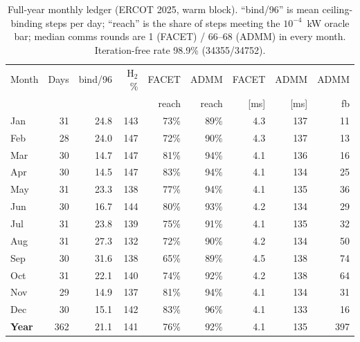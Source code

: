 \begin{table}[H]\centering\small
\begin{tabular}{lrrrrrrrr}
\toprule
Month & Days & bind/96 & H$_2$\% & FACET & ADMM & FACET & ADMM & ADMM\\
 & & & & reach & reach & [ms] & [ms] & fb\\
\midrule
Jan & 31 & 24.8 & 143 & 73\% & 89\% & 4.3 & 137 & 11\\
Feb & 28 & 24.0 & 147 & 72\% & 90\% & 4.3 & 137 & 13\\
Mar & 30 & 14.7 & 147 & 81\% & 94\% & 4.1 & 136 & 16\\
Apr & 30 & 14.5 & 147 & 83\% & 94\% & 4.1 & 134 & 25\\
May & 31 & 23.3 & 138 & 77\% & 94\% & 4.1 & 135 & 36\\
Jun & 30 & 16.7 & 144 & 80\% & 93\% & 4.2 & 134 & 29\\
Jul & 31 & 23.8 & 139 & 75\% & 91\% & 4.1 & 135 & 32\\
Aug & 31 & 27.3 & 132 & 72\% & 90\% & 4.2 & 134 & 50\\
Sep & 30 & 31.6 & 138 & 65\% & 89\% & 4.5 & 138 & 74\\
Oct & 31 & 22.1 & 140 & 74\% & 92\% & 4.2 & 138 & 64\\
Nov & 29 & 14.9 & 137 & 81\% & 94\% & 4.1 & 134 & 31\\
Dec & 30 & 15.1 & 142 & 83\% & 96\% & 4.1 & 133 & 16\\
\midrule
\textbf{Year} & 362 & 21.1 & 141 & 76\% & 92\% & 4.1 & 135 & 397\\
\bottomrule
\end{tabular}
\caption{Full-year monthly ledger (ERCOT 2025, warm block). ``bind/96'' is mean ceiling-binding steps per day; ``reach'' is the share of steps meeting the $10^{-4}$~kW oracle bar; median comms rounds are 1 (FACET) / 66--68 (ADMM) in every month. Iteration-free rate 98.9\% (34355/34752).}
\label{tab:year-monthly}
\end{table}
